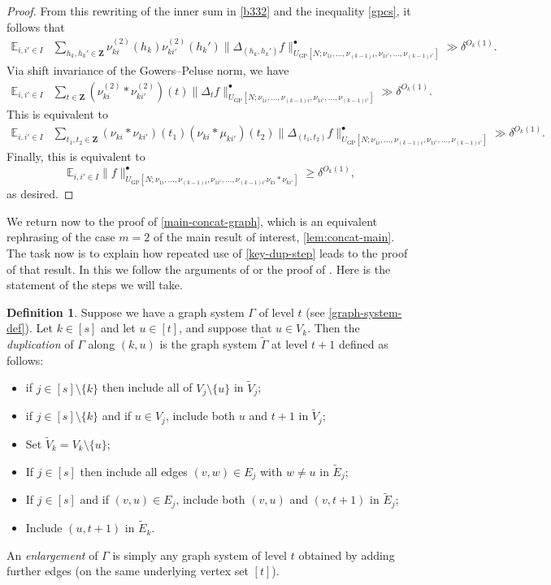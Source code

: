 \documentclass[11pt,reqno]{amsart}
\numberwithin{equation}{section}
\theoremstyle{definition}
\newtheorem{definition}[theorem]{Definition}
\theoremstyle{remark}
\newcommand{\snorm}[1]{\lVert#1\rVert}
\newcommand{\mb}{\mathbb}
\renewcommand{\ge}{\geqslant}
\newcommand\Z{\mathbf{Z}}
\newcommand\E{\mb{E}}
\newcommand\GP{\operatorname{GP}}
\begin{document}
\begin{proof}
From this rewriting of the inner sum in \cref{b332} and the inequality \cref{gpcs}, it follows that 
\begin{align*}
\E_{i,i'\in I}&\sum_{h_k,h_k'\in \Z}\nu^{(2)}_{ki}(h_k)\nu^{(2)}_{ki'}(h_k')\snorm{\Delta_{(h_k,h_k')}f}^{\bullet}_{U_{\GP}[N;\nu_{1i},\ldots,\nu_{(k-1)i},\nu_{1i'},\ldots,\nu_{(k-1)i'}]}\gg \delta^{O_k(1)}.
\end{align*}
Via shift invariance of the Gowers--Peluse norm, we have 
\begin{align*}
\E_{i,i'\in I}&\sum_{t\in \Z}(\nu^{(2)}_{ki}\ast \nu^{(2)}_{ki'})(t) \snorm{\Delta_{t}f}^{\bullet}_{U_{\GP}[N;\nu_{1i},\ldots,\nu_{(k-1)i},\nu_{1i'},\ldots,\nu_{(k-1)i'}]}\gg \delta^{O_k(1)}.
\end{align*}
This is equivalent to 
\begin{align*}
\E_{i,i'\in I}&\sum_{t_1,t_2\in \Z}(\nu_{ki}\ast \nu_{ki'})(t_1) (\nu_{ki}\ast \mu_{ki'})(t_2) \snorm{\Delta_{(t_1,t_2)}f}^{\bullet}_{U_{\GP}[N;\nu_{1i},\ldots,\nu_{(k-1)i},\nu_{1i'},\ldots,\nu_{(k-1)i'}]}\gg \delta^{O_k(1)}.
\end{align*}
Finally, this is equivalent to 
\[\E_{i,i'\in I}\snorm{f}^{\bullet}_{U_{\GP}[N;\nu_{1i},\ldots,\nu_{(k-1)i},\nu_{1i'},\ldots,\nu_{(k-1)i'} \nu_{ki} \ast \nu_{ki'}]}\ge \delta^{O_k(1)}, \]
as desired. 
\end{proof}



We return now to the proof of \cref{main-concat-graph}, which is an equivalent rephrasing of the case $m = 2$ of the main result of interest, \cref{lem:concat-main}. The task now is to explain how repeated use of \cref{key-dup-step} leads to the proof of that result. In this we follow the arguments of \cite[pages 10--11]{kuca} or the proof of \cite[Proposition 6.2]{KKL24}. Here is the statement of the steps we will take.

\begin{definition}\label{duplication-def}
Suppose we have a graph system $\Gamma$ of level $t$ (see \cref{graph-system-def}). Let $k \in [s]$ and let $u \in [t]$, and suppose that $u \in V_k$. Then the \emph{duplication} of $\Gamma$ along $(k,u)$ is the graph system $\tilde\Gamma$ at level $t+1$ defined as follows:
\begin{itemize}
\item if $j \in [s] \setminus \{k\}$ then include all of $V_j \setminus \{u\}$ in $\tilde V_j$;
\item if $j \in [s] \setminus \{k\}$ and if $u \in V_j$, include both $u$ and $t+1$ in $\tilde V_j$;
\item Set $\tilde V_k = V_k \setminus \{u\}$;
\item If $j \in [s]$ then include all edges $(v,w) \in E_j$ with $w \neq u$ in $\tilde E_j$;
\item If $j \in [s]$ and if $(v,u) \in E_j$, include both $(v,u)$ and $(v,t+1)$ in $\tilde E_j$;
\item Include $(u,t+1)$ in $\tilde E_k$.
\end{itemize}
An \emph{enlargement} of $\Gamma$ is simply any graph system of level $t$ obtained by adding further edges (on the same underlying vertex set $[t]$).
\end{definition}
\end{document}
